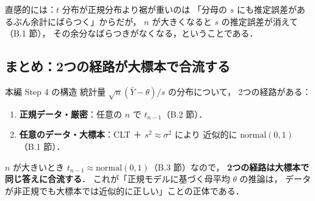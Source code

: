 \documentclass[lualatex,ja=standard,a4paper,12pt]{bxjsarticle}
\begin{document}
\medskip
直感的には：$t$ 分布が正規分布より裾が重いのは
「分母の $s$ にも推定誤差があるぶん余計にばらつく」からだが，
$n$ が大きくなると $s$ の推定誤差が消えて（B.1 節），
その余分なばらつきがなくなる，ということである．

\subsection{まとめ：2つの経路が大標本で合流する}

\begin{thmbox}{本編 Step 4 の構造}
統計量 $\sqrt{n}(\bar{Y}-\theta)/s$ の分布について，
2つの経路がある：
\begin{enumerate}
  \item \textbf{正規データ・厳密}：任意の $n$ で $t_{n-1}$（B.2 節）．
  \item \textbf{任意のデータ・大標本}：CLT ＋ $s^2 \approx \sigma^2$ により
        近似的に $\mathrm{normal}(0,1)$（B.1 節）．
\end{enumerate}
$n$ が大きいとき $t_{n-1} \approx \mathrm{normal}(0,1)$（B.3 節）なので，
\textbf{2つの経路は大標本で同じ答えに合流する}．
これが「正規モデルに基づく母平均 $\theta$ の推論は，
データが非正規でも大標本では近似的に正しい」ことの正体である．
\end{thmbox}
\end{document}
